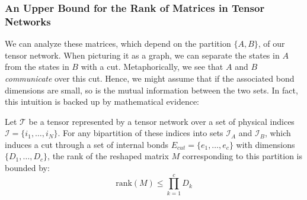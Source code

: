\documentclass[../../main.tex]{subfiles}
\begin{document}
    \subsubsection{An Upper Bound for the Rank of Matrices in Tensor Networks}
    We can analyze these matrices, which depend on the partition $\{A, B\}$, of our tensor network. When picturing it as a graph, we can separate the states in $A$ from the states in $B$ with a cut. Metaphorically, we see that $A$ and $B$ \emph{communicate} over this cut. Hence, we might assume that if the associated bond dimensions are small, so is the mutual information between the two sets. In fact, this intuition is backed up by mathematical evidence:

    \begin{theorem}
    \label{theorem:min_cut_caps_rank}
Let $\mathcal{T}$ be a tensor represented by a tensor network over a set of physical indices $\mathcal{I} = \{i_1, \dots, i_N\}$. For any bipartition of these indices into sets $\mathcal{I}_A$ and $\mathcal{I}_B$, which induces a cut through a set of internal bonds $E_{cut} = \{e_1, \dots, e_c\}$ with dimensions $\{D_1, \dots, D_c\}$, the rank of the reshaped matrix $M$ corresponding to this partition is bounded by:
$$
\text{rank}(M) \le \prod_{k=1}^{c} D_k
$$
\end{theorem}
\end{document}
